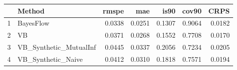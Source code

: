 \documentclass[12pt]{article}
\begin{document}
\thispagestyle{empty}
\begin{table}[ht]
\centering
\begin{tabular}{rlrrrrr}
  \hline
 & Method & rmspe & mae & is90 & cov90 & CRPS \\ 
  \hline
1 & BayesFlow & 0.0338 & 0.0251 & 0.1307 & 0.9064 & 0.0182 \\ 
  2 & VB & 0.0371 & 0.0268 & 0.1552 & 0.7708 & 0.0170 \\ 
  3 & VB\_Synthetic\_MutualInf & 0.0445 & 0.0337 & 0.2056 & 0.7234 & 0.0205 \\ 
  4 & VB\_Synthetic\_Naive & 0.0412 & 0.0310 & 0.1818 & 0.7571 & 0.0194 \\ 
   \hline
\end{tabular}
\end{table}
\end{document}
